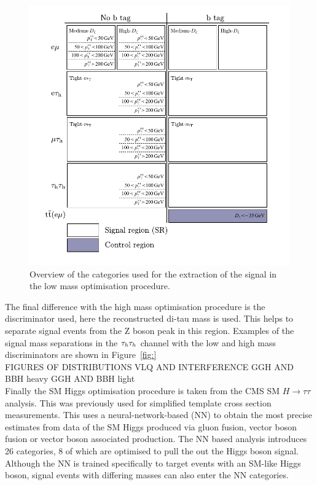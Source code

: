 \begin{figure}[!hbtp]
\centering
    \includegraphics[width=1.0\textwidth]{Figures/low_mass_categories.pdf}
\caption{Overview of the categories used for the extraction of the signal in the low mass optimisation procedure.}
\label{fig:low_mass_categories}
\end{figure}

The final difference with the high mass optimisation procedure is the discriminator used, here the reconstructed di-tau mass is used.
This helps to separate signal events from the Z boson peak in this region.
Examples of the signal mass separations in the $\tau_{h}\tau_{h}$ channel with the low and high mass discriminators are shown in Figure~\ref{fig:} \\

FIGURES OF DISTRIBUTIONS
VLQ AND INTERFERENCE
GGH AND BBH heavy
GGH AND BBH light \\

Finally the SM Higgs optimisation procedure is taken from the CMS SM $H \rightarrow \tau\tau$ analysis.
This was previously used for simplified template cross section measurements.
This uses a neural-network-based (NN) to obtain the most precise estimates from data of the SM Higgs produced via gluon fusion, vector boson fusion or vector boson associated production.
The NN based analysis introduces 26 categories, 8 of which are optimised to pull the out the Higgs boson signal.
Although the NN is trained specifically to target events with an SM-like Higgs boson, signal events with differing masses can also enter the NN categories.

